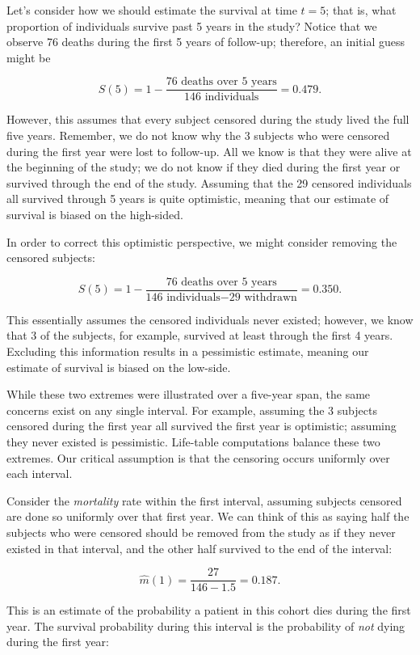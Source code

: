 \documentclass[
  letterpaper,
  DIV=11,
  numbers=noendperiod]{scrreprt}
\theoremstyle{definition}
\theoremstyle{definition}
\theoremstyle{remark}
\begin{document}
Let's consider how we should estimate the survival at time \(t = 5\);
that is, what proportion of individuals survive past 5 years in the
study? Notice that we observe 76 deaths during the first 5 years of
follow-up; therefore, an initial guess might be

\[S(5) = 1 - \frac{\text{76 deaths over 5 years}}{\text{146 individuals}} = 0.479.\]

However, this assumes that every subject censored during the study lived
the full five years. Remember, we do not know why the 3 subjects who
were censored during the first year were lost to follow-up. All we know
is that they were alive at the beginning of the study; we do not know if
they died during the first year or survived through the end of the
study. Assuming that the 29 censored individuals all survived through 5
years is quite optimistic, meaning that our estimate of survival is
biased on the high-sided.

In order to correct this optimistic perspective, we might consider
removing the censored subjects:

\[S(5) = 1 - \frac{\text{76 deaths over 5 years}}{\text{146 individuals} - \text{29 withdrawn}} = 0.350.\]

This essentially assumes the censored individuals never existed;
however, we know that 3 of the subjects, for example, survived at least
through the first 4 years. Excluding this information results in a
pessimistic estimate, meaning our estimate of survival is biased on the
low-side.

While these two extremes were illustrated over a five-year span, the
same concerns exist on any single interval. For example, assuming the 3
subjects censored during the first year all survived the first year is
optimistic; assuming they never existed is pessimistic. Life-table
computations balance these two extremes. Our critical assumption is that
the censoring occurs uniformly over each interval.

Consider the \emph{mortality} rate within the first interval, assuming
subjects censored are done so uniformly over that first year. We can
think of this as saying half the subjects who were censored should be
removed from the study as if they never existed in that interval, and
the other half survived to the end of the interval:

\[\widehat{m}(1) = \frac{27}{146 - 1.5} = 0.187.\]

This is an estimate of the probability a patient in this cohort dies
during the first year. The survival probability during this interval is
the probability of \emph{not} dying during the first year:
\end{document}
